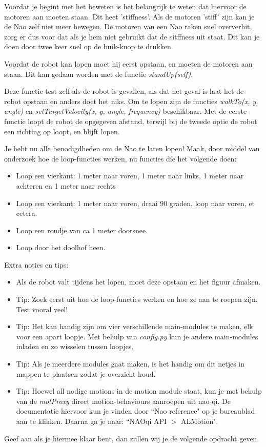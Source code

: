 \documentclass[a4paper]{article}
\begin{document}
Voordat je begint met het beweten is het belangrijk te weten dat hiervoor de motoren aan moeten staan. Dit heet 'stiffness'. Als de motoren 'stiff' zijn kan je de Nao zelf niet meer bewegen. De motoren van een Nao raken snel oververhit, zorg er dus voor dat als je hem niet gebruikt dat de sitffness uit staat. Dit kan je doen door twee keer snel op de buik-knop te drukken.

Voordat de robot kan lopen moet hij eerst opstaan, en moeten de motoren aan staan. Dit kan gedaan worden met de functie \textit{standUp(self)}.

Deze functie test zelf als de robot is gevallen, als dat het geval is laat het de robot opstaan en anders doet het niks.
Om te lopen zijn de functies \textit{walkTo(x, y, angle)} en \textit{setTargetVelocity(x, y, angle, frequency)} beschikbaar.
Met de eerste functie loopt de robot de opgegeven afstand, terwijl bij de tweede optie de robot een richting op loopt, en blijft lopen.

Je hebt nu alle benodigdheden om de Nao te laten lopen! Maak, door middel van onderzoek hoe de loop-functies werken, nu functies die het volgende doen:
\begin{itemize}
\item Loop een vierkant: 1 meter naar voren, 1 meter naar links, 1 meter naar achteren en 1 meter naar rechts
\item Loop een vierkant: 1 meter naar voren, draai 90 graden, loop naar voren, et cetera.
\item Loop een rondje van ca 1 meter doorsnee.
\item Loop door het doolhof heen.
\end{itemize}

Extra noties en tips:
\begin{itemize}
\item Als de robot valt tijdens het lopen, moet deze opstaan en het figuur afmaken.
\item Tip: Zoek eerst uit hoe de loop-functies werken en hoe ze aan te roepen zijn. Test vooral veel!
\item Tip: Het kan handig zijn om vier verschillende main-modules te maken, elk voor een apart loopje. Met behulp van \textit{config.py} kun je andere main-modules inladen en zo wisselen tussen loopjes.
\item Tip: Als je meerdere modules gaat maken, is het handig om dit netjes in mappen te plaatsen zodat je overzicht houd.

\item Tip: Hoewel all nodige motions in de motion module staat, kun je met behulp van de \textit{motProxy} direct motion-behaviours aanroepen uit nao-qi. De documentatie hiervoor kun je vinden door ``Nao reference" op je bureaublad aan te klikken. Daarna ga je naar: ``NAOqi API $>$ ALMotion". 
\end{itemize}

Geef aan als je hiermee klaar bent, dan zullen wij je de volgende opdracht geven.
\end{document}
